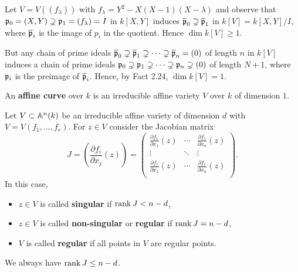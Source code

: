 \begin{Bsp}
Let $V=V((f_\lambda))$ with $f_\lambda = Y^2-X(X-1)(X-\lambda)$ and observe that
$\mathfrak{p}_0 =(X,Y) \supsetneq \mathfrak{p}_1 =(f_\lambda) = I$ in $k[X,Y]$ induces
$\overline{\mathfrak{p}}_0 \supsetneq \overline{\mathfrak{p}}_1$ in $ k[V] = k[X,Y] / I$, where $\overline{\mathfrak{p}}_i$ is the image of $p_i$ in the quotient. Hence $\dim k[V] \geq 1$.

But any chain of prime ideals $\overline{\mathfrak{p}}_0 \supsetneq \overline{\mathfrak{p}}_1 \supsetneq \cdots \supsetneq \overline{\mathfrak{p}}_n =(0) $ of length $n$  in $k[V]$ induces a chain of prime ideals 
${\mathfrak{p}}_0 \supsetneq {\mathfrak{p}}_1 \supsetneq \cdots \supsetneq {\mathfrak{p}}_n \supsetneq (0) $ 
of length $N+1$, where $\mathfrak{p}_i$ is the preimage of $\overline{\mathfrak{p}}_i$.
Hence, by Fact 2.24, $\dim k[V] = 1$.
\end{Bsp}

\begin{defi}
An \textbf{affine curve} over $k$ is an irreducible affine variety $V$ over $k$ of dimension $1$.
\end{defi}


\begin{defi}
Let $V \subset \mathbb{A}^n(k)$ be an irreducible affine variety of dimension $d$ with $V=V(f_1,\dots,f_r)$.
For $z \in V$ consider the Jacobian matrix
\[ J = \left( \frac{\partial f_i}{\partial x_j} (z)  \right) = \begin{pmatrix}
\frac{\partial f_1}{\partial x_1} (z) & \cdots & \frac{\partial f_1}{\partial x_n} (z) \\
\vdots & \ddots & \vdots \\
\frac{\partial f_r}{\partial x_1} (z) & \cdots & \frac{\partial f_r}{\partial x_n} (z) \\
\end{pmatrix}.
\]
In this case,
\begin{itemize}
	\item $z\in V$ is called \textbf{singular} if $\operatorname{rank} J < n-d$,
	\item $z\in V$ is called \textbf{non-singular} or \textbf{regular} if $\operatorname{rank} J = n-d$,
	\item $V$ is called \textbf{regular} if all points in $V$ are regular points.
\end{itemize}
\end{defi}

\begin{Fakt}
We always have $\operatorname{rank} J \leq n-d$.
\end{Fakt}


